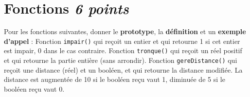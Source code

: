 
\section{Fonctions \hfill \textit{6 points}}

Pour les fonctions suivantes, donner le \textbf{prototype}, la \textbf{définition} et un \textbf{exemple d'appel} :
    \UPSTIquestion Fonction \texttt{impair()} qui reçoit un entier et qui retourne 1 si cet entier est impair, 0 dans le cas contraire.
\espaceReponse{5cm}
    \UPSTIquestion Fonction \texttt{tronque()} qui reçoit un réel positif et qui retourne la partie entière (sans arrondir).
\espaceReponse{5cm}
    \UPSTIquestion Fonction \texttt{gereDistance()} qui reçoit une distance (réel) et un booléen, et qui retourne la distance modifiée. La distance est augmentée de 10 si le booléen reçu vaut 1, diminuée de 5 si le booléen reçu vaut 0.

\espaceReponse{5cm}
